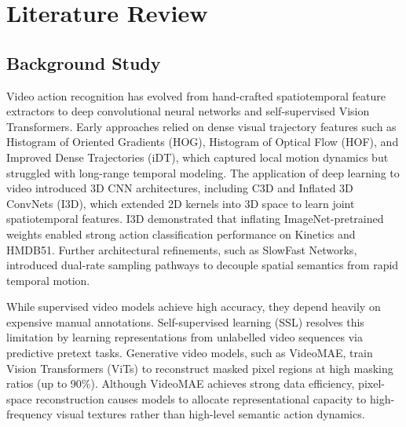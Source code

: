 \chapter{Literature Review}

\section{Background Study}

Video action recognition has evolved from hand-crafted spatiotemporal feature extractors to deep convolutional neural networks and self-supervised Vision Transformers. Early approaches relied on dense visual trajectory features such as Histogram of Oriented Gradients (HOG), Histogram of Optical Flow (HOF), and Improved Dense Trajectories (iDT), which captured local motion dynamics but struggled with long-range temporal modeling. The application of deep learning to video introduced 3D CNN architectures, including C3D and Inflated 3D ConvNets (I3D), which extended 2D kernels into 3D space to learn joint spatiotemporal features. I3D demonstrated that inflating ImageNet-pretrained weights enabled strong action classification performance on Kinetics and HMDB51. Further architectural refinements, such as SlowFast Networks, introduced dual-rate sampling pathways to decouple spatial semantics from rapid temporal motion.

While supervised video models achieve high accuracy, they depend heavily on expensive manual annotations. Self-supervised learning (SSL) resolves this limitation by learning representations from unlabelled video sequences via predictive pretext tasks. Generative video models, such as VideoMAE, train Vision Transformers (ViTs) to reconstruct masked pixel regions at high masking ratios (up to 90\%). Although VideoMAE achieves strong data efficiency, pixel-space reconstruction causes models to allocate representational capacity to high-frequency visual textures rather than high-level semantic action dynamics.

